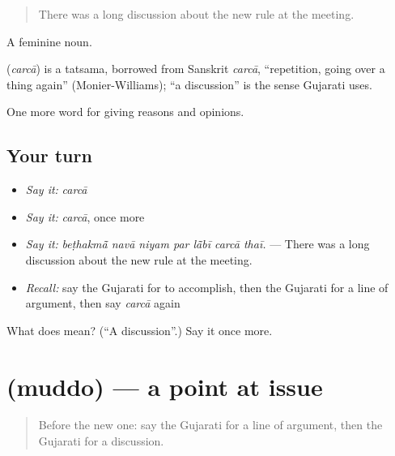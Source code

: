 \begin{quote}
There was a long discussion about the new rule at the meeting.
\end{quote}

A feminine noun.

\begin{cousinweb}
\textbf{} (\emph{carcā}) is a tatsama, borrowed from Sanskrit \emph{carcā}, \textquotedblleft{}repetition, going over a thing again\textquotedblright{} (Monier-Williams); \textquotedblleft{}a discussion\textquotedblright{} is the sense Gujarati uses.
\end{cousinweb}

\begin{grammarlens}[title={What you've built}]
One more word for giving reasons and opinions.
\end{grammarlens}

\subsection*{Your turn}
\begin{itemize}
\raggedright
  \item \emph{Say it:} \emph{carcā}
  \item \emph{Say it:} \emph{carcā}, once more
  \item \emph{Say it:} \emph{beṭhakmā̃ navā niyam par lā̃bī carcā thaī.} — There was a long discussion about the new rule at the meeting.
  \item \emph{Recall:} say the Gujarati for to accomplish, then the Gujarati for a line of argument, then say \emph{carcā} again
\end{itemize}

\begin{tcolorbox}[breakable,colback=teal!4,colframe=teal!35!black,title={Before you move on}]
What does  mean? (\textquotedblleft{}A discussion\textquotedblright{}.) Say it once more.
\end{tcolorbox}
\section[\texorpdfstring{\gu{મુદ્દો} (muddo)}{મુદ્દો (muddo)}]{ (muddo) — a point at issue}

\label{lesson:GU-C341-muddo}



\begin{quote}
Before the new one: say the Gujarati for a line of argument, then the Gujarati for a discussion.
\end{quote}

